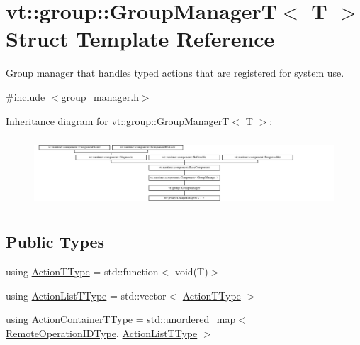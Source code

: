 \hypertarget{structvt_1_1group_1_1_group_manager_t}{}\section{vt\+:\+:group\+:\+:Group\+ManagerT$<$ T $>$ Struct Template Reference}
\label{structvt_1_1group_1_1_group_manager_t}


Group manager that handles typed actions that are registered for system use.  




{\ttfamily \#include $<$group\+\_\+manager.\+h$>$}

Inheritance diagram for vt\+:\+:group\+:\+:Group\+ManagerT$<$ T $>$\+:\begin{figure}[H]
\begin{center}
\leavevmode
\includegraphics[height=2.600619cm]{structvt_1_1group_1_1_group_manager_t}
\end{center}
\end{figure}
\subsection*{Public Types}
\begin{DoxyCompactItemize}
\item 
using \hyperlink{structvt_1_1group_1_1_group_manager_t_acb20922687d3165d97de391fdbaf02ca}{Action\+T\+Type} = std\+::function$<$ void(T)$>$
\item 
using \hyperlink{structvt_1_1group_1_1_group_manager_t_a653158254f8de50d4070f0621644a48a}{Action\+List\+T\+Type} = std\+::vector$<$ \hyperlink{structvt_1_1group_1_1_group_manager_t_acb20922687d3165d97de391fdbaf02ca}{Action\+T\+Type} $>$
\item 
using \hyperlink{structvt_1_1group_1_1_group_manager_t_adc0d6d680c4f8bdbb80cd90f84a5f7ee}{Action\+Container\+T\+Type} = std\+::unordered\+\_\+map$<$ \hyperlink{namespacevt_1_1group_a73f2624ddeb535b39a08b6524f26b244}{Remote\+Operation\+I\+D\+Type}, \hyperlink{structvt_1_1group_1_1_group_manager_t_a653158254f8de50d4070f0621644a48a}{Action\+List\+T\+Type} $>$
\end{DoxyCompactItemize}
